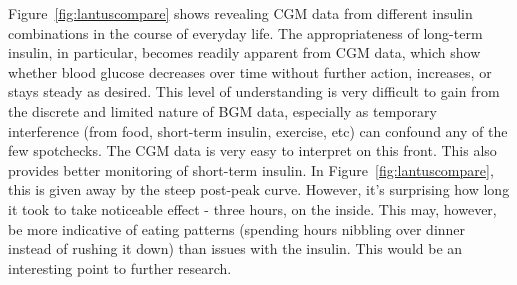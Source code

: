 Figure~\ref{fig:lantuscompare} shows revealing CGM data from different insulin combinations in the course of everyday life. The appropriateness of long-term insulin, in particular, becomes readily apparent from CGM data, which show whether blood glucose decreases over time without further action, increases, or stays steady as desired. This level of understanding is very difficult to gain from the discrete and limited nature of BGM data, especially as temporary interference (from food, short-term insulin, exercise, etc) can confound any of the few spotchecks. The CGM data is very easy to interpret on this front. This also provides better monitoring of short-term insulin. In Figure~\ref{fig:lantuscompare}, this is given away by the steep post-peak curve. However, it’s surprising how long it took to take noticeable effect - three hours, on the inside. This may, however, be more indicative of eating patterns (spending hours nibbling over dinner instead of rushing it down) than issues with the insulin. This would be an interesting point to further research. 